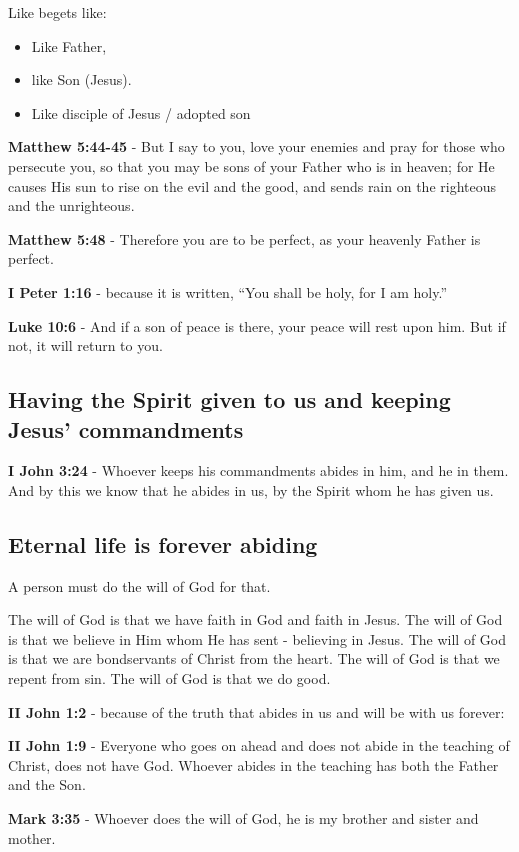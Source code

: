 \documentclass[11pt]{article}
\begin{document}
Like begets like:
\begin{itemize}
\item Like Father,
\item like Son (Jesus).
\item Like disciple of Jesus / adopted son
\end{itemize}

\textbf{Matthew 5:44-45} - But I say to you, love your enemies and pray for those who persecute you, so that you may be sons of your Father who is in heaven; for He causes His sun to rise on the evil and the good, and sends rain on the righteous and the unrighteous.

\textbf{Matthew 5:48} - Therefore you are to be perfect, as your heavenly Father is perfect.

\textbf{I Peter 1:16} - because it is written, “You shall be holy, for I am holy.”

\textbf{Luke 10:6} - And if a son of peace is there, your peace will rest upon him. But if not, it will return to you.

\subsection{Having the Spirit given to us and keeping Jesus' commandments}
\label{sec:org912ad27}
\textbf{I John 3:24} - Whoever keeps his commandments abides in him, and he in them. And by this we know that he abides in us, by the Spirit whom he has given us.

\subsection{Eternal life is forever abiding}
\label{sec:org07cd80f}
A person must do the will of God for that.

The will of God is that we have faith in God and faith in Jesus.
The will of God is that we believe in Him whom He has sent - believing in Jesus.
The will of God is that we are bondservants of Christ from the heart.
The will of God is that we repent from sin.
The will of God is that we do good.

\textbf{II John 1:2} - because of the truth that abides in us and will be with us forever:

\textbf{II John 1:9} - Everyone who goes on ahead and does not abide in the teaching of Christ, does not have God. Whoever abides in the teaching has both the Father and the Son.

\textbf{Mark 3:35} - Whoever does the will of God, he is my brother and sister and mother.
\end{document}
